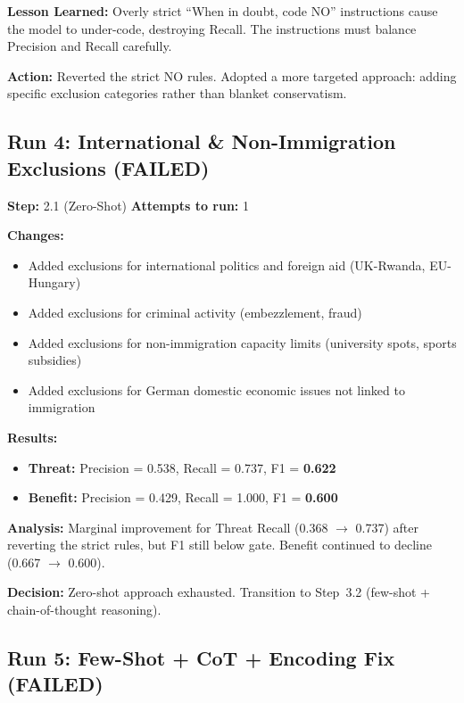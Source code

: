 \textbf{Lesson Learned:} Overly strict ``When in doubt, code NO'' instructions cause the model to under-code, destroying Recall. The instructions must balance Precision and Recall carefully.

\textbf{Action:} Reverted the strict NO rules. Adopted a more targeted approach: adding specific exclusion categories rather than blanket conservatism.

\subsection{Run 4: International \& Non-Immigration Exclusions (FAILED)}
\label{sec:run4}

\textbf{Step:} 2.1 (Zero-Shot) \quad \textbf{Attempts to run:} 1

\textbf{Changes:}
\begin{itemize}
    \item Added exclusions for international politics and foreign aid (UK-Rwanda, EU-Hungary)
    \item Added exclusions for criminal activity (embezzlement, fraud)
    \item Added exclusions for non-immigration capacity limits (university spots, sports subsidies)
    \item Added exclusions for German domestic economic issues not linked to immigration
\end{itemize}

\textbf{Results:}
\begin{itemize}
    \item \textbf{Threat:} Precision = 0.538, Recall = 0.737, F1 = \textbf{0.622}
    \item \textbf{Benefit:} Precision = 0.429, Recall = 1.000, F1 = \textbf{0.600}
\end{itemize}

\textbf{Analysis:} Marginal improvement for Threat Recall (0.368 $\rightarrow$ 0.737) after reverting the strict rules, but F1 still below gate. Benefit continued to decline (0.667 $\rightarrow$ 0.600).

\textbf{Decision:} Zero-shot approach exhausted. Transition to Step~3.2 (few-shot + chain-of-thought reasoning).

\subsection{Run 5: Few-Shot + CoT + Encoding Fix (FAILED)}
\label{sec:run5}

